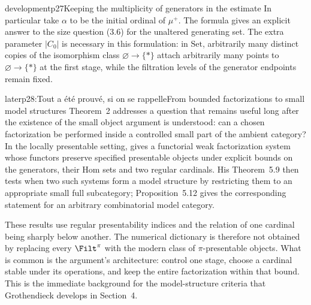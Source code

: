 \begin{dcomment}{development}{p27}{Keeping the multiplicity of generators in the estimate}
In particular take $\alpha$ to be the initial ordinal of $\mu^+$. The formula gives an explicit answer to the size question (3.6) for the unaltered generating set. The extra parameter $|C_0|$ is necessary in this formulation: in $\mathrm{Set}$, arbitrarily many distinct copies of the isomorphism class $\varnothing\to\{*\}$ attach arbitrarily many points to $\varnothing\to\{*\}$ at the first stage, while the filtration levels of the generator endpoints remain fixed.
\end{dcomment}

\begin{dcomment}{later}{p28:Tout a été prouvé, si on se rappelle}{From bounded factorizations to small model structures}
Theorem~2 addresses a question that remains useful long after the existence of the small object argument is understood: can a chosen factorization be performed inside a controlled small part of the ambient category? In the locally presentable setting, \citet[Theorem 4.4]{Low2016Heart} gives a functorial weak factorization system whose functors preserve specified presentable objects under explicit bounds on the generators, their Hom sets and two regular cardinals. His Theorem~5.9 then tests when two such systems form a model structure by restricting them to an appropriate small full subcategory; Proposition~5.12 gives the corresponding statement for an arbitrary combinatorial model category.

These results use regular presentability indices and the relation of one cardinal being sharply below another. The numerical dictionary is therefore not obtained by replacing every $\Filt^\pi$ with the modern class of $\pi$-presentable objects. What is common is the argument's architecture: control one stage, choose a cardinal stable under its operations, and keep the entire factorization within that bound. This is the immediate background for the model-structure criteria that Grothendieck develops in Section~4.
\end{dcomment}



